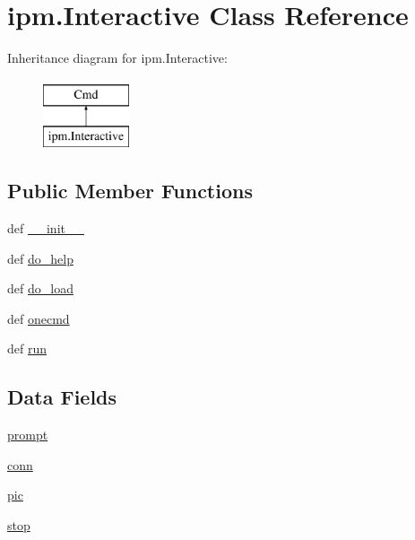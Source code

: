 \hypertarget{classipm_1_1_interactive}{\section{ipm.\-Interactive Class Reference}
\label{classipm_1_1_interactive}
}
Inheritance diagram for ipm.\-Interactive\-:\begin{figure}[H]
\begin{center}
\leavevmode
\includegraphics[height=2.000000cm]{classipm_1_1_interactive}
\end{center}
\end{figure}
\subsection*{Public Member Functions}
\begin{DoxyCompactItemize}
\item 
def \hyperlink{classipm_1_1_interactive_a7e4b1f301906a07a2503ca3783a43cd8}{\-\_\-\-\_\-init\-\_\-\-\_\-}
\item 
def \hyperlink{classipm_1_1_interactive_aa022c0b64113003a0ddbbe37d0007628}{do\-\_\-help}
\item 
def \hyperlink{classipm_1_1_interactive_a047e9c9e094bff77c0d29bdd3bdb8670}{do\-\_\-load}
\item 
def \hyperlink{classipm_1_1_interactive_a09e3a980d636af3ee352919b888b3739}{onecmd}
\item 
def \hyperlink{classipm_1_1_interactive_a6da0221def4cd18c43f8e22234bcdd34}{run}
\end{DoxyCompactItemize}
\subsection*{Data Fields}
\begin{DoxyCompactItemize}
\item 
\hyperlink{classipm_1_1_interactive_a964ba8ffe297358a7c06d25529652b09}{prompt}
\item 
\hyperlink{classipm_1_1_interactive_ae99255a60205eac688154da222de76e8}{conn}
\item 
\hyperlink{classipm_1_1_interactive_a261360cc196e8ae1c1fe04db82bf0269}{pic}
\item 
\hyperlink{classipm_1_1_interactive_a8c8a00cb8784305a2203b1e7091ca74a}{stop}
\end{DoxyCompactItemize}

